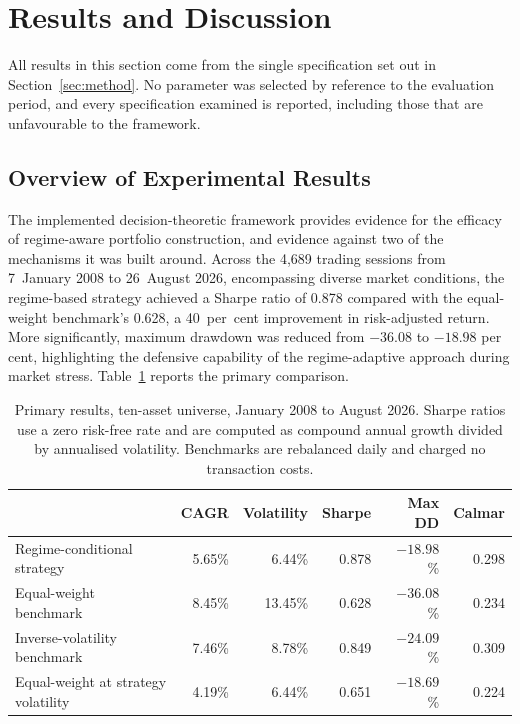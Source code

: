 \section{Results and Discussion}
\label{sec:results}

All results in this section come from the single specification set out in
Section~\ref{sec:method}. No parameter was selected by reference to the evaluation
period, and every specification examined is reported, including those that are
unfavourable to the framework.

\subsection{Overview of Experimental Results}

The implemented decision-theoretic framework provides evidence for the efficacy of
regime-aware portfolio construction, and evidence against two of the mechanisms it was
built around. Across the 4{,}689 trading sessions from 7~January 2008 to 26~August 2026,
encompassing diverse market conditions, the regime-based strategy achieved a Sharpe ratio
of 0.878 compared with the equal-weight benchmark's 0.628, a 40~per~cent improvement in
risk-adjusted return. More significantly, maximum drawdown was reduced from $-36.08$ to
$-18.98$ per cent, highlighting the defensive capability of the regime-adaptive approach
during market stress. Table~\ref{tab:main} reports the primary comparison.

\begin{table}[!ht]
\centering
\caption{Primary results, ten-asset universe, January 2008 to August 2026. Sharpe
ratios use a zero risk-free rate and are computed as compound annual growth divided by
annualised volatility. Benchmarks are rebalanced daily and charged no transaction costs.}
\label{tab:main}
\footnotesize
\begin{tabular}{p{4.4cm}rrrrr}
\hline
& \textbf{CAGR} & \textbf{Volatility} & \textbf{Sharpe} & \textbf{Max DD} & \textbf{Calmar} \\
\hline
Regime-conditional strategy & 5.65\% & 6.44\% & 0.878 & $-18.98$\% & 0.298 \\
Equal-weight benchmark & 8.45\% & 13.45\% & 0.628 & $-36.08$\% & 0.234 \\
Inverse-volatility benchmark & 7.46\% & 8.78\% & 0.849 & $-24.09$\% & 0.309 \\
Equal-weight at strategy volatility & 4.19\% & 6.44\% & 0.651 & $-18.69$\% & 0.224 \\
\hline
\end{tabular}
\end{table}

